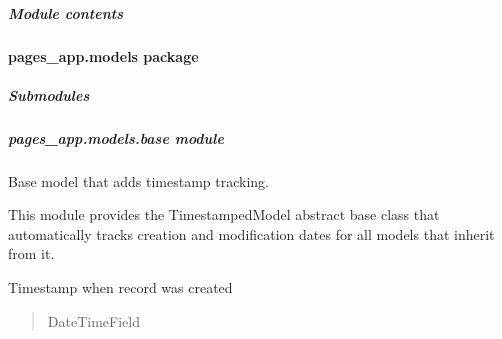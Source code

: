 \documentclass[letterpaper,10pt,english]{sphinxmanual}
\begin{document}
\subparagraph{Module contents}
\label{\detokenize{pages_app.migrations:module-pages_app.migrations}}\label{\detokenize{pages_app.migrations:module-contents}}
\sphinxstepscope


\paragraph{pages\_app.models package}
\label{\detokenize{pages_app.models:pages-app-models-package}}\label{\detokenize{pages_app.models::doc}}

\subparagraph{Submodules}
\label{\detokenize{pages_app.models:submodules}}

\subparagraph{pages\_app.models.base module}
\label{\detokenize{pages_app.models:module-pages_app.models.base}}\label{\detokenize{pages_app.models:pages-app-models-base-module}}
\sphinxAtStartPar
Base model that adds timestamp tracking.

\sphinxAtStartPar
This module provides the TimestampedModel abstract base class that automatically
tracks creation and modification dates for all models that inherit from it.

\begin{fulllineitems}
\label{\detokenize{pages_app.models:pages_app.models.base.created_at}}
\pysigstartsignatures
\pysigline
{}
\pysigstopsignatures
\sphinxAtStartPar
Timestamp when record was created
\begin{quote}\begin{description}
\sphinxAtStartPar
DateTimeField

\end{description}\end{quote}

\end{fulllineitems}

\end{document}
